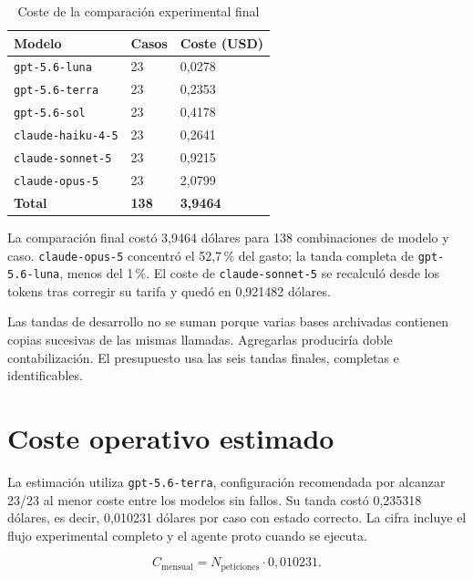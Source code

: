 \begin{table}[H]
\centering
\small
\caption{Coste de la comparación experimental final}
\label{tab:coste_experimentacion_final}
\begin{tabular}{|P{4.3cm}|P{3.0cm}|P{3.0cm}|}
\hline
\textbf{Modelo} & \textbf{Casos} & \textbf{Coste (USD)} \\
\hline
\texttt{gpt-5.6-luna} & 23 & 0,0278 \\
\hline
\texttt{gpt-5.6-terra} & 23 & 0,2353 \\
\hline
\texttt{gpt-5.6-sol} & 23 & 0,4178 \\
\hline
\texttt{claude-haiku-4-5} & 23 & 0,2641 \\
\hline
\texttt{claude-sonnet-5} & 23 & 0,9215 \\
\hline
\texttt{claude-opus-5} & 23 & 2,0799 \\
\hline
\textbf{Total} & \textbf{138} & \textbf{3,9464} \\
\hline
\end{tabular}
\end{table}

La comparación final costó 3,9464 dólares para 138 combinaciones de modelo y caso. \texttt{claude-opus-5} concentró el 52,7\,\% del gasto; la tanda completa de \texttt{gpt-5.6-luna}, menos del 1\,\%. El coste de \texttt{claude-sonnet-5} se recalculó desde los tokens tras corregir su tarifa y quedó en 0,921482 dólares.

Las tandas de desarrollo no se suman porque varias bases archivadas contienen copias sucesivas de las mismas llamadas. Agregarlas produciría doble contabilización. El presupuesto usa las seis tandas finales, completas e identificables.

\section{Coste operativo estimado}
\label{sec:coste_operativo}

La estimación utiliza \texttt{gpt-5.6-terra}, configuración recomendada por alcanzar 23/23 al menor coste entre los modelos sin fallos. Su tanda costó 0,235318 dólares, es decir, 0,010231 dólares por caso con estado correcto. La cifra incluye el flujo experimental completo y el agente proto cuando se ejecuta.

\begin{equation}
C_{\text{mensual}}=N_{\text{peticiones}}\cdot0{,}010231.
\end{equation}


